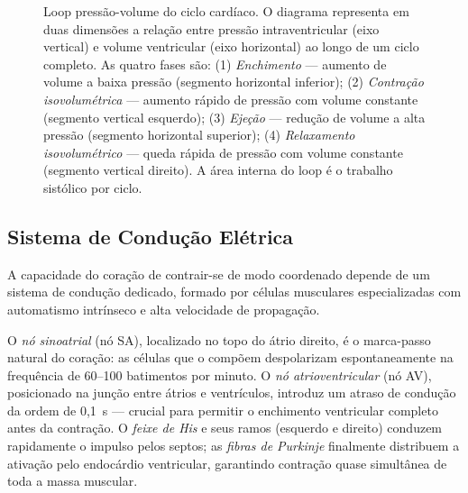 \begin{figure}[htbp]
\centering
{}
\caption{Loop pressão-volume do ciclo cardíaco. O diagrama representa em duas dimensões a relação entre pressão intraventricular (eixo vertical) e volume ventricular (eixo horizontal) ao longo de um ciclo completo. As quatro fases são: (1) \emph{Enchimento} --- aumento de volume a baixa pressão (segmento horizontal inferior); (2) \emph{Contração isovolumétrica} --- aumento rápido de pressão com volume constante (segmento vertical esquerdo); (3) \emph{Ejeção} --- redução de volume a alta pressão (segmento horizontal superior); (4) \emph{Relaxamento isovolumétrico} --- queda rápida de pressão com volume constante (segmento vertical direito). A área interna do loop é o trabalho sistólico por ciclo.}
\label{fig:12-loop-pv}
\end{figure}

\subsection{Sistema de Condução Elétrica}
\label{sub:image12-conducao}

A capacidade do coração de contrair-se de modo coordenado depende de um
sistema de condução dedicado, formado por células musculares
especializadas com automatismo intrínseco e alta velocidade de propagação.

O \emph{nó sinoatrial} (nó SA), localizado no topo do átrio direito, é o
marca-passo natural do coração: as células que o compõem despolarizam
espontaneamente na frequência de 60--100 batimentos por minuto. O
\emph{nó atrioventricular} (nó AV), posicionado na junção entre átrios e
ventrículos, introduz um atraso de condução da ordem de 0,1~s --- crucial
para permitir o enchimento ventricular completo antes da contração. O
\emph{feixe de His} e seus ramos (esquerdo e direito) conduzem rapidamente
o impulso pelos septos; as \emph{fibras de Purkinje} finalmente distribuem
a ativação pelo endocárdio ventricular, garantindo contração quase
simultânea de toda a massa muscular.

